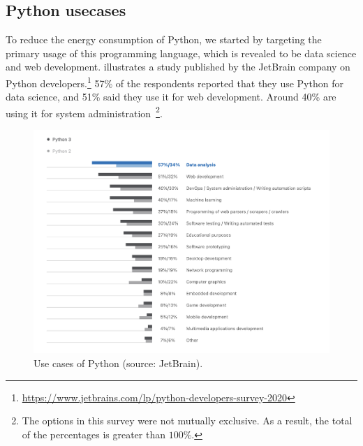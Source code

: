 \subsection{Python usecases}
To reduce the energy consumption of Python, we started by targeting the primary usage of this programming language, which is revealed to be data science and web development.
 illustrates a study published by the JetBrain company on Python developers.\footnote{\url{https://www.jetbrains.com/lp/python-developers-survey-2020}}
57\% of the respondents reported that they use Python for data science, and 51\% said they use it for web development. Around 40\% are using it for system administration~\footnote{The options in this survey were not mutually exclusive. As a result, the total of the percentages is greater than $100\%$.}.

\begin{figure}[hbt]
    \centering
    \includegraphics[width=\linewidth]{imgs/python_use_cases}
    \caption{Use cases of Python (source: JetBrain).}
    \label{fig:usecase}
\end{figure}

